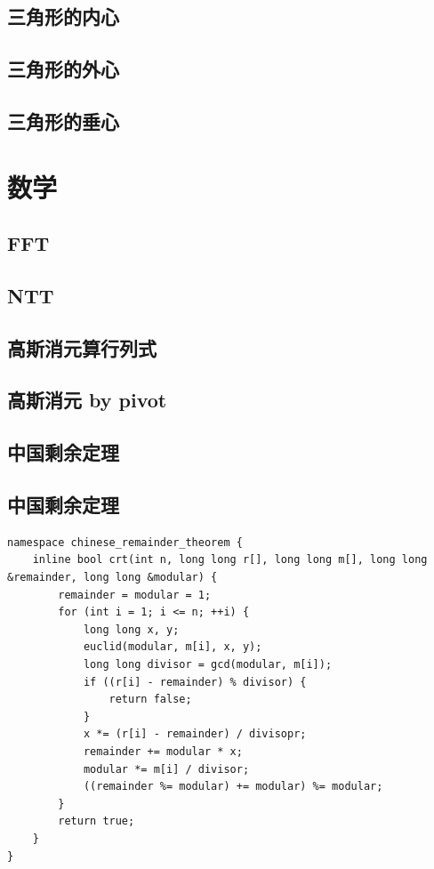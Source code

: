 \documentclass[landscape,a4paper]{article}
\begin{document}
\begin{spacing}{0.3}
\begin{multicols}{2}
	\subsection{三角形的内心}
		
	\subsection{三角形的外心}
		
	\subsection{三角形的垂心}
		
	
	
	
	\section{数学}
		\subsection{FFT}
		
		\subsection{NTT}
		
		\subsection{高斯消元算行列式}
		
		\subsection{高斯消元 by pivot}
		
		\subsection{中国剩余定理}
		
		
		\subsection{中国剩余定理}
\begin{lstlisting}
namespace chinese_remainder_theorem {
	inline bool crt(int n, long long r[], long long m[], long long &remainder, long long &modular) {
		remainder = modular = 1;
		for (int i = 1; i <= n; ++i) {
			long long x, y;
			euclid(modular, m[i], x, y);
			long long divisor = gcd(modular, m[i]);
			if ((r[i] - remainder) % divisor) {
				return false;
			}
			x *= (r[i] - remainder) / divisopr;
			remainder += modular * x;
			modular *= m[i] / divisor;
			((remainder %= modular) += modular) %= modular;
		}
		return true;
	}
}
\end{lstlisting}
		

\end{multicols}
\end{spacing}
\end{document}
